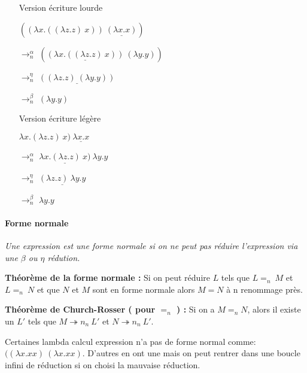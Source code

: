 \documentclass[10pt,a4paper]{article}
\begin{document}
				\begin{multicols}{2}{
					\begin{itemize}
						\item[] Version écriture lourde
						\item[] $((\lambda x.((\lambda z.z)~x))~\underline{(\lambda x.x)})$
						\item[$\rightarrow_{n}^{\alpha}$] $(\underline{(\lambda x.((\lambda z.z)~x))}~(\lambda y.y))$
						\item[$\rightarrow_{n}^{\eta}$] $\underline{((\lambda z.z)~(\lambda y.y))}$
						\item[$\rightarrow_{n}^{\beta}$] $(\lambda y.y)$
					\end{itemize}
				
					\begin{itemize}
						\item[] Version écriture légère
						\item[] $\lambda x.(\lambda z.z)~x)~\underline{\lambda x.x}$
						\item[$\rightarrow_{n}^{\alpha}$] $\underline{\lambda x.(\lambda z.z)~x)}~\lambda y.y$
						\item[$\rightarrow_{n}^{\eta}$] $\underline{(\lambda z.z)~\lambda y.y}$
						\item[$\rightarrow_{n}^{\beta}$] $\lambda y.y$
					\end{itemize}
				}
				\end{multicols}
				\bigbreak
				
				
				\paragraph{Forme normale}
			
				\textit{Une expression est une forme normale si on ne peut pas réduire l'expression via une $\beta$ ou $\eta$ rédution.}
				\medbreak
			
				\textbf{Théorème de la forme normale :}
				Si on peut réduire $L$ tels que $L =_{n}~M$ et $L =_{n}~N$ et que $N$ et $M$ sont en forme normale alors $M = N$ à n renommage près.
				\medbreak	
			
				\textbf{Théorème de Church-Rosser ( pour $=_{n}$ ) :}
				Si on a $M =_{n} N$, alors il existe un $L'$ tels que $M \twoheadrightarrow n_{n}~L'$ et $N \twoheadrightarrow n_{n}~L'$.
				\medbreak
			
				Certaines lambda calcul expression n'a pas de forme normal comme: $((\lambda x.x x)~(\lambda x.x x)$. 
				D'autres en ont une mais on peut rentrer dans une boucle infini de réduction si on choisi la mauvaise réduction.
				\medbreak
			
\end{document}
